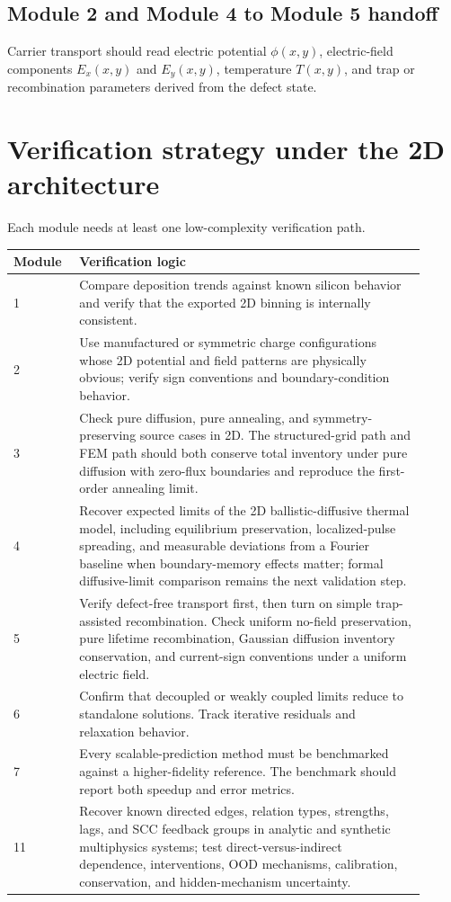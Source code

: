 \documentclass[11pt]{article}
\begin{document}
\subsection{Module 2 and Module 4 to Module 5 handoff}
Carrier transport should read electric potential $\phi(x,y)$, electric-field components $E_x(x,y)$ and $E_y(x,y)$, temperature $T(x,y)$, and trap or recombination parameters derived from the defect state.

\section{Verification strategy under the 2D architecture}
Each module needs at least one low-complexity verification path.

\begin{longtable}{p{0.14\linewidth} p{0.77\linewidth}}
\toprule
\textbf{Module} & \textbf{Verification logic}\\
\midrule
1 & Compare deposition trends against known silicon behavior and verify that the exported 2D binning is internally consistent.\\
2 & Use manufactured or symmetric charge configurations whose 2D potential and field patterns are physically obvious; verify sign conventions and boundary-condition behavior.\\
3 & Check pure diffusion, pure annealing, and symmetry-preserving source cases in 2D. The structured-grid path and FEM path should both conserve total inventory under pure diffusion with zero-flux boundaries and reproduce the first-order annealing limit.\\
4 & Recover expected limits of the 2D ballistic-diffusive thermal model, including equilibrium preservation, localized-pulse spreading, and measurable deviations from a Fourier baseline when boundary-memory effects matter; formal diffusive-limit comparison remains the next validation step.\\
5 & Verify defect-free transport first, then turn on simple trap-assisted recombination. Check uniform no-field preservation, pure lifetime recombination, Gaussian diffusion inventory conservation, and current-sign conventions under a uniform electric field.\\
6 & Confirm that decoupled or weakly coupled limits reduce to standalone solutions. Track iterative residuals and relaxation behavior.\\
7 & Every scalable-prediction method must be benchmarked against a higher-fidelity reference. The benchmark should report both speedup and error metrics.\\
11 & Recover known directed edges, relation types, strengths, lags, and SCC feedback groups in analytic and synthetic multiphysics systems; test direct-versus-indirect dependence, interventions, OOD mechanisms, calibration, conservation, and hidden-mechanism uncertainty.\\
\bottomrule
\end{longtable}
\end{document}
